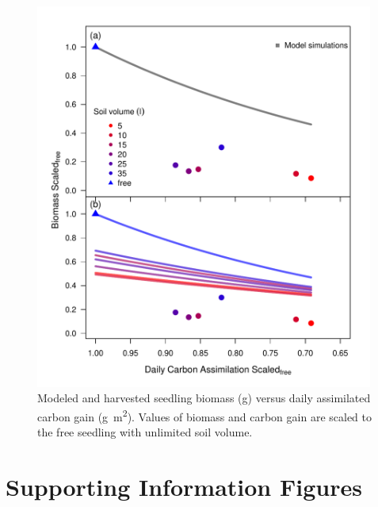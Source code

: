\documentclass[a4paper]{article}\usepackage[]{graphicx}\usepackage[]{color}
\begin{document}
\begin{figure}[h!]
    \centering
    \includegraphics[width=0.99\textwidth]{gC_day.pdf}
    \caption{Modeled and harvested seedling biomass (g) versus daily assimilated carbon gain (g~m\textsuperscript{2}).  Values of biomass and carbon gain are scaled to the free seedling with unlimited soil volume.}
    \label{fig:figure6}
\end{figure}

\clearpage
\section{Supporting Information Figures}

\renewcommand\thefigure{S\arabic{figure}}    
\setcounter{figure}{0}   
\end{document}
